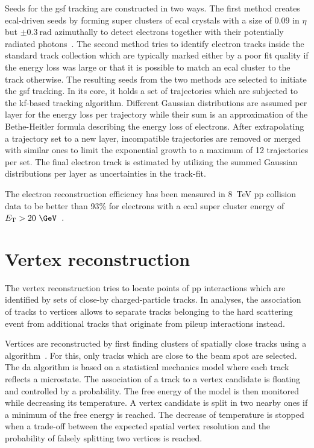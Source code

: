 Seeds for the \gls{gsf} tracking are constructed in two ways. The first method creates \gls{ecal}-driven seeds by forming super clusters of \gls{ecal} crystals with a size of 0.09 in $\eta$ but $\pm0.3~\mathrm{rad}$ azimuthally to detect electrons together with their potentially radiated photons~\cite{CMS:2010aua}. The second method tries to identify electron tracks inside the standard track collection which are typically marked either by a poor fit quality if the energy loss was large or that it is possible to match an \gls{ecal} cluster to the track otherwise. The resulting seeds from the two methods are selected to initiate the \gls{gsf} tracking. In its core, it holds a set of trajectories which are subjected to the \gls{kf}-based tracking algorithm. Different Gaussian distributions are assumed per layer for the energy loss per trajectory while their sum is an approximation of the Bethe-Heitler formula describing the energy loss of electrons. After extrapolating a trajectory set to a new layer, incompatible trajectories are removed or merged with similar ones to limit the exponential growth to a maximum of 12 trajectories per set. The final electron track is estimated by utilizing the summed Gaussian distributions per layer as uncertainties in the track-fit. 

The electron reconstruction efficiency has been measured in 8~TeV pp collision data to be better than 93\% for electrons with a \gls{ecal} super cluster energy of $E_\mathrm{T}>20~\GeV$~\cite{Khachatryan:2015hwa}.



\section{Vertex reconstruction}


The vertex reconstruction tries to locate points of pp interactions which are identified by sets of close-by charged-particle tracks. In analyses, the association of tracks to vertices allows to separate tracks belonging to the hard scattering event from additional tracks that originate from pileup interactions instead.

Vertices are reconstructed by first finding clusters of spatially close tracks using a  algorithm~\cite{726788}. For this, only tracks which are close to the beam spot are selected. The \gls{da} algorithm is based on a statistical mechanics model where each track reflects a microstate. The association of a track to a vertex candidate is floating and controlled by a probability. The free energy of the model is then monitored while decreasing its temperature. A vertex candidate is split in two nearby ones if a minimum of the free energy is reached. The decrease of temperature is stopped when a trade-off between the expected spatial vertex resolution and the probability of falsely splitting two vertices is reached.

